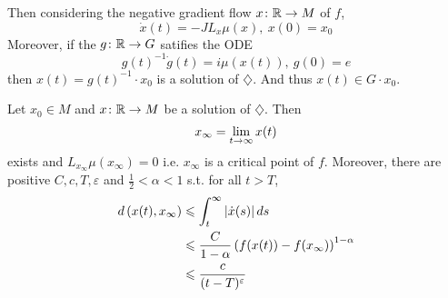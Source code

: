 \documentclass[a4paper,12pt]{article}
\begin{document}
	Then considering the negative gradient flow $x \colon \mathbb{R} \rightarrow M$ of $f$,
	\begin{equation*}
		\dot{x}(t) = -JL_x\mu(x),~x(0) = x_0 \tag{$\diamondsuit$}
	\end{equation*}
	Moreover, if the $g \colon \mathbb{R} \rightarrow G$ satifies the ODE
	\begin{equation*}
		g(t)^{-1}\dot{g}(t) = i\mu(x(t)),~g(0)=e
	\end{equation*}
	then $x(t) = g(t)^{-1}\cdot x_0$ is a solution of $\diamondsuit$. And thus $x(t) \in G \cdot x_0$. 

	\begin{thm}
		Let $x_0 \in M$ and $x \colon \mathbb{R} \rightarrow M$ be a solution of $\diamondsuit$. Then
		\begin{equation*}
			x_{\infty}  = \lim_{t \rightarrow \infty}x(t)
		\end{equation*}
		exists and $L_{x_{\infty}}\mu(x_{\infty}) = 0$ i.e. $x_{\infty}$ is a critical point of $f$. Moreover, there are positive $C,c,T,\varepsilon$ and $\frac{1}{2}<\alpha < 1$ s.t. for all $t > T$,
		\begin{equation*}
			\begin{split}
				d\left(x(t),x_{\infty}\right) &\leqslant \int_t^{\infty} \left\lvert\dot{x}(s)\right\lvert ds \\
				&\leqslant \frac{C}{1-\alpha}\left(f(x(t))-f(x_{\infty})\right)^{1-\alpha} \\
				&\leqslant \frac{c}{(t-T)^{\varepsilon}}
			\end{split}
		\end{equation*}
	\end{thm}
\end{document}
